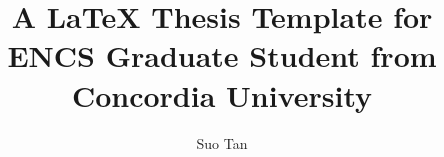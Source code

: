 \documentclass[letterpaper,11pt,onecolumn,final]{report}              %
\author{Suo Tan}    %
\title{A \LaTeX{} Thesis Template for ENCS Graduate Student from Concordia University}    %
\begin{document}
	

\coverPage
\signaturePage


\contentLists





\appendix
\setcounter{table}{0}		%
\setcounter{figure}{0}		%
\renewcommand{\thefigure}{\Alph{chapter}.\arabic{figure}} 	%
\renewcommand{\thetable}{\Alph{chapter}.\arabic{table}}		%

\begin{appendices}
    
\end{appendices}





\end{document}
